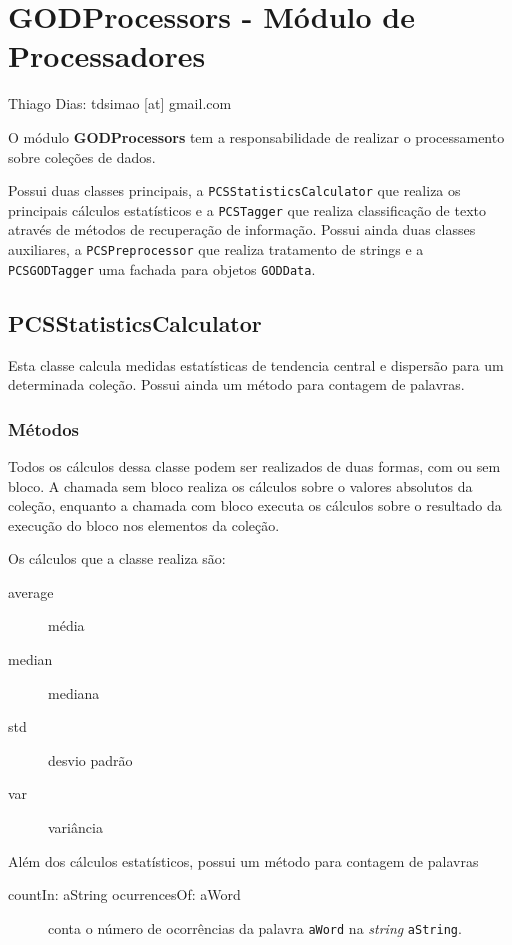 \section{GODProcessors - Módulo de Processadores}
\begin{center}
Thiago Dias: tdsimao [at] gmail.com
\end{center}


O módulo \textbf{GODProcessors} tem a responsabilidade de realizar o processamento sobre
coleções de dados.

Possui duas classes principais, a \texttt{PCSStatisticsCalculator} que realiza os principais
cálculos estatísticos e a \texttt{PCSTagger} que realiza classificação de texto através de
métodos de recuperação de informação. Possui ainda duas classes auxiliares, a
\texttt{PCSPreprocessor} que realiza tratamento de strings e a \texttt{PCSGODTagger} uma fachada
para objetos \texttt{GODData}.

\subsection{PCSStatisticsCalculator} 

Esta classe calcula medidas estatísticas de tendencia central e dispersão para um determinada
coleção. Possui ainda um método para contagem de palavras.


\subsubsection{Métodos}
Todos os cálculos dessa classe podem ser realizados de duas formas, com ou sem bloco. A chamada
sem bloco realiza os cálculos sobre o valores absolutos da coleção, enquanto a chamada com
bloco executa os cálculos sobre o resultado da execução do bloco nos elementos da coleção.

Os cálculos que a classe realiza são:
\begin{description}
    \item[average] média 
    \item[median] mediana
    \item[std] desvio padrão
    \item[var] variância
\end{description}

Além dos cálculos estatísticos, possui um método para contagem de palavras

\begin{description}
    \item[countIn: aString ocurrencesOf: aWord] conta o número de ocorrências da palavra
                   \texttt{aWord} na \textit{string} \texttt{aString}.
\end{description}

